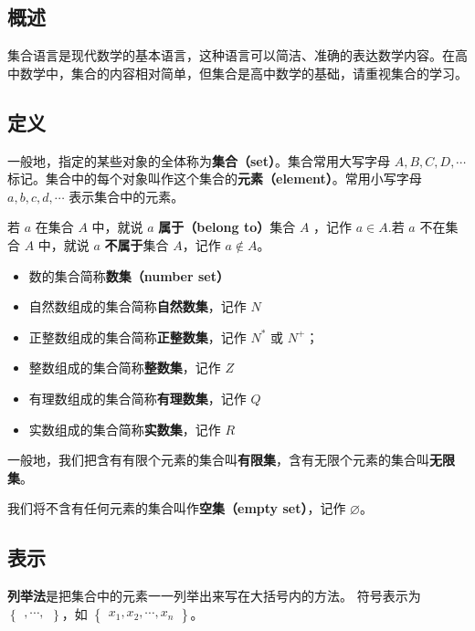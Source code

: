 
\subsection{概述}
集合语言是现代数学的基本语言，这种语言可以简洁、准确的表达数学内容。在高中数学中，集合的内容相对简单，但集合是高中数学的基础，请重视集合的学习。

\subsection{定义}
一般地，指定的某些对象的全体称为\textbf{集合（set）}。集合常用大写字母 $A,B,C,D,\cdots$ 标记。集合中的每个对象叫作这个集合的\textbf{元素（element）}。常用小写字母 $a,b,c,d,\cdots$ 表示集合中的元素。

若 $a$ 在集合 $A$ 中，就说 $a$ \textbf{属于（belong to）}集合 $A$ ，记作 $a \in A$.若 $a$ 不在集合 $A$ 中，就说 $a$ \textbf{不属于}集合 $A$，记作 $a\notin A$。

\begin{itemize}
\item 数的集合简称\textbf{数集（number set）}
\item 自然数组成的集合简称\textbf{自然数集}，记作 $N$
\item 正整数组成的集合简称\textbf{正整数集}，记作 $N^{*}$ 或 $N^{+}$； 
\item 整数组成的集合简称\textbf{整数集}，记作 $Z$
\item 有理数组成的集合简称\textbf{有理数集}，记作 $Q$
\item 实数组成的集合简称\textbf{实数集}，记作 $R$
\end{itemize}

一般地，我们把含有有限个元素的集合叫\textbf{有限集}，含有无限个元素的集合叫\textbf{无限集}。

我们将不含有任何元素的集合叫作\textbf{空集（empty set）}，记作 $\varnothing$。

\subsection{表示}
\textbf{列举法}是把集合中的元素一一列举出来写在大括号内的方法。
符号表示为 $\begin{Bmatrix} ,\cdots, \end{Bmatrix}$，如 $\begin{Bmatrix} x_1,x_2, \cdots ,x_n \end{Bmatrix}$。


